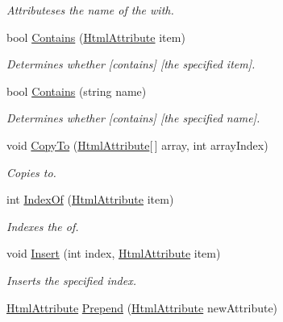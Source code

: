 \begin{DoxyCompactItemize}
\begin{DoxyCompactList}\small\item\em Attributeses the name of the with. \end{DoxyCompactList}\item 
bool \hyperlink{class_html_agility_pack_1_1_html_attribute_collection_af24a94b022b18a5689798dad77675f80}{Contains} (\hyperlink{class_html_agility_pack_1_1_html_attribute}{Html\+Attribute} item)
\begin{DoxyCompactList}\small\item\em Determines whether \mbox{[}contains\mbox{]} \mbox{[}the specified item\mbox{]}. \end{DoxyCompactList}\item 
bool \hyperlink{class_html_agility_pack_1_1_html_attribute_collection_ad6085d0d48d215fa7215e9ea97fcd16d}{Contains} (string name)
\begin{DoxyCompactList}\small\item\em Determines whether \mbox{[}contains\mbox{]} \mbox{[}the specified name\mbox{]}. \end{DoxyCompactList}\item 
void \hyperlink{class_html_agility_pack_1_1_html_attribute_collection_ae6f38d0cbc217187f623dd844be9847b}{Copy\+To} (\hyperlink{class_html_agility_pack_1_1_html_attribute}{Html\+Attribute}\mbox{[}$\,$\mbox{]} array, int array\+Index)
\begin{DoxyCompactList}\small\item\em Copies to. \end{DoxyCompactList}\item 
int \hyperlink{class_html_agility_pack_1_1_html_attribute_collection_a752ef23fb3e6d7e1dc77c343c13a8be2}{Index\+Of} (\hyperlink{class_html_agility_pack_1_1_html_attribute}{Html\+Attribute} item)
\begin{DoxyCompactList}\small\item\em Indexes the of. \end{DoxyCompactList}\item 
void \hyperlink{class_html_agility_pack_1_1_html_attribute_collection_ae4687bb563db94897a01b3909dafc4ab}{Insert} (int index, \hyperlink{class_html_agility_pack_1_1_html_attribute}{Html\+Attribute} item)
\begin{DoxyCompactList}\small\item\em Inserts the specified index. \end{DoxyCompactList}\item 
\hyperlink{class_html_agility_pack_1_1_html_attribute}{Html\+Attribute} \hyperlink{class_html_agility_pack_1_1_html_attribute_collection_aa25f953de7c898b029f8765d9f36cb47}{Prepend} (\hyperlink{class_html_agility_pack_1_1_html_attribute}{Html\+Attribute} new\+Attribute)

\end{DoxyCompactItemize}
